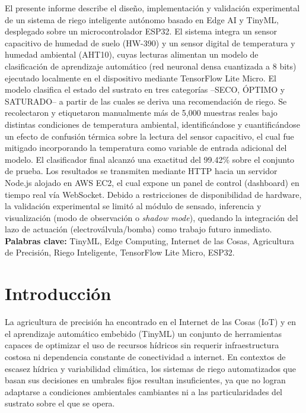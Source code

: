 \documentclass[12pt,a4paper]{article}
\begin{document}
El presente informe describe el diseño, implementación y validación experimental de un sistema de riego inteligente autónomo basado en Edge AI y TinyML, desplegado sobre un microcontrolador ESP32. El sistema integra un sensor capacitivo de humedad de suelo (HW-390) y un sensor digital de temperatura y humedad ambiental (AHT10), cuyas lecturas alimentan un modelo de clasificación de aprendizaje automático (red neuronal densa cuantizada a 8 bits) ejecutado localmente en el dispositivo mediante TensorFlow Lite Micro. El modelo clasifica el estado del sustrato en tres categorías --SECO, ÓPTIMO y SATURADO-- a partir de las cuales se deriva una recomendación de riego. Se recolectaron y etiquetaron manualmente más de 5{,}000 muestras reales bajo distintas condiciones de temperatura ambiental, identificándose y cuantificándose un efecto de confusión térmica sobre la lectura del sensor capacitivo, el cual fue mitigado incorporando la temperatura como variable de entrada adicional del modelo. El clasificador final alcanzó una exactitud del 99.42\% sobre el conjunto de prueba. Los resultados se transmiten mediante HTTP hacia un servidor Node.js alojado en AWS EC2, el cual expone un panel de control (dashboard) en tiempo real vía WebSocket. Debido a restricciones de disponibilidad de hardware, la validación experimental se limitó al módulo de sensado, inferencia y visualización (modo de observación o \textit{shadow mode}), quedando la integración del lazo de actuación (electroválvula/bomba) como trabajo futuro inmediato.\\

\vspace{0.3cm}
\noindent \textbf{Palabras clave:} TinyML, Edge Computing, Internet de las Cosas, Agricultura de Precisión, Riego Inteligente, TensorFlow Lite Micro, ESP32.

\newpage

\section{Introducción}

La agricultura de precisión ha encontrado en el Internet de las Cosas (IoT) y en el aprendizaje automático embebido (TinyML) un conjunto de herramientas capaces de optimizar el uso de recursos hídricos sin requerir infraestructura costosa ni dependencia constante de conectividad a internet. En contextos de escasez hídrica y variabilidad climática, los sistemas de riego automatizados que basan sus decisiones en umbrales fijos resultan insuficientes, ya que no logran adaptarse a condiciones ambientales cambiantes ni a las particularidades del sustrato sobre el que se opera.\\
\end{document}
